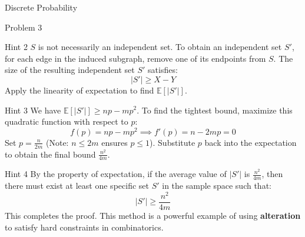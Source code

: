 \documentclass{beamer}
\begin{document}
\begin{section}{Discrete Probability}
\begin{subsection}{Problem 3}
\begin{frame}
        \pause
        \vspace{1em}
        \begin{block}{Hint 2}
            $S$ is not necessarily an independent set. To obtain an independent set $S'$, for each edge in the induced subgraph, remove one of its endpoints from $S$. 
            The size of the resulting independent set $S'$ satisfies:
            \[
                |S'| \ge X - Y
            \]
            Apply the linearity of expectation to find $\mathbb{E}[|S'|]$.
        \end{block}
    \end{frame}

    \begin{frame}
        \begin{block}{Hint 3}
            We have $\mathbb{E}[|S'|] \ge np - mp^2$. To find the tightest bound, maximize this quadratic function with respect to $p$:
            \[
                f(p) = np - mp^2 \implies f'(p) = n - 2mp = 0
            \]
            Set $p = \frac{n}{2m}$ (Note: $n \le 2m$ ensures $p \le 1$). 
            Substitute $p$ back into the expectation to obtain the final bound $\frac{n^2}{4m}$.
        \end{block}
    \end{frame} 

    \begin{frame}
        \begin{block}{Hint 4}
            By the property of expectation, if the average value of $|S'|$ is $\frac{n^2}{4m}$, then there must exist at least one specific set $S'$ in the sample space such that:
            \[
                |S'| \ge \frac{n^2}{4m}
            \]
            This completes the proof. This method is a powerful example of using \textbf{alteration} to satisfy hard constraints in combinatorics.
        \end{block}
    \end{frame}
\end{subsection}

\end{section}
\end{document}
